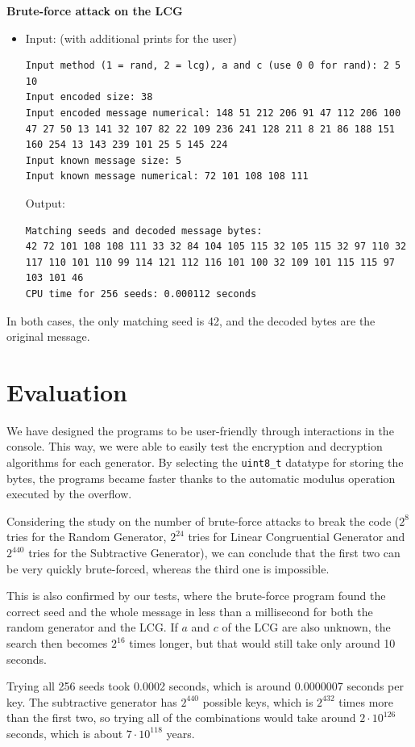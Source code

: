 \documentclass[a4paper,10pt]{article}
\begin{document}
\textbf{Brute-force attack on the LCG}
\begin{itemize}
\item Input: (with additional prints for the user)
\begin{lstlisting}[style = stdio]
Input method (1 = rand, 2 = lcg), a and c (use 0 0 for rand): 2 5 10
Input encoded size: 38
Input encoded message numerical: 148 51 212 206 91 47 112 206 100 47 27 50 13 141 32 107 82 22 109 236 241 128 211 8 21 86 188 151 160 254 13 143 239 101 25 5 145 224
Input known message size: 5
Input known message numerical: 72 101 108 108 111
\end{lstlisting}

  Output:
\begin{lstlisting}[style = stdio]
Matching seeds and decoded message bytes:
42 72 101 108 108 111 33 32 84 104 105 115 32 105 115 32 97 110 32 117 110 101 110 99 114 121 112 116 101 100 32 109 101 115 115 97 103 101 46
CPU time for 256 seeds: 0.000112 seconds
\end{lstlisting}
\end{itemize}
In both cases, the only matching seed is 42, and the decoded bytes are the original message.



\section{Evaluation}

We have designed the programs to be user-friendly through interactions in the console. This way, we were able to easily test the encryption and decryption algorithms for each generator. By selecting the \texttt{uint8\_t} datatype for storing the bytes, the programs became faster thanks to the automatic modulus operation executed by the overflow.

Considering the study on the number of brute-force attacks to break the code ($2^8$ tries for the Random Generator, $2^{24}$ tries for Linear Congruential Generator and $2^{440}$ tries for the Subtractive Generator), we can conclude that the first two can be very quickly brute-forced, whereas the third one is impossible.

This is also confirmed by our tests, where the brute-force program found the correct seed and the whole message in less than a millisecond for both the random generator and the LCG. If $a$ and $c$ of the LCG are also unknown, the search then becomes $2^{16}$ times longer, but that would still take only around 10 seconds.

Trying all 256 seeds took 0.0002 seconds, which is around 0.0000007 seconds per key. The subtractive generator has $2^{440}$ possible keys, which is $2^{432}$ times more than the first two, so trying all of the combinations would take around $2 \cdot 10^{126}$ seconds, which is about $7 \cdot 10^{118}$ years.
\end{document}

